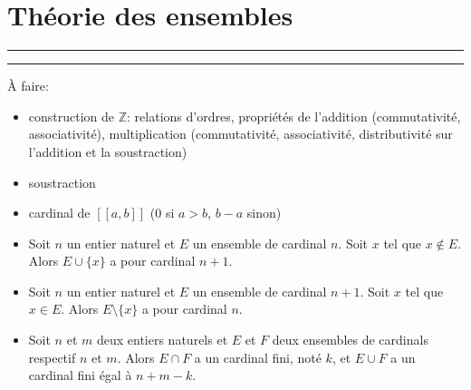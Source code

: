 \section{Théorie des ensembles}















\bigskip

\hrule
\hrule

\medskip

\noindent À faire:
\begin{itemize}
    \item construction de $\mathbb{Z}$: relations d'ordres, propriétés de l'addition (commutativité, associativité), multiplication (commutativité, associativité, distributivité sur l'addition et la soustraction)
    \item soustraction
    \item cardinal de $[\![a,b]\!]$ ($0$ si $a > b$, $b-a$ sinon)
    \item Soit $n$ un entier naturel et $E$ un ensemble de cardinal $n$. Soit $x$ tel que $x \notin E$. Alors $E \cup \lbrace x \rbrace$ a pour cardinal $n+1$.
    \item Soit $n$ un entier naturel et $E$ un ensemble de cardinal $n+1$. Soit $x$ tel que $x \in E$. Alors $E \setminus \lbrace x \rbrace$ a pour cardinal $n$.
    \item Soit $n$ et $m$ deux entiers naturels et $E$ et $F$ deux ensembles de cardinals respectif $n$ et $m$. Alors $E \cap F$ a un cardinal fini, noté $k$, et $E \cup F$ a un cardinal fini égal à $n+m-k$.
\end{itemize}
